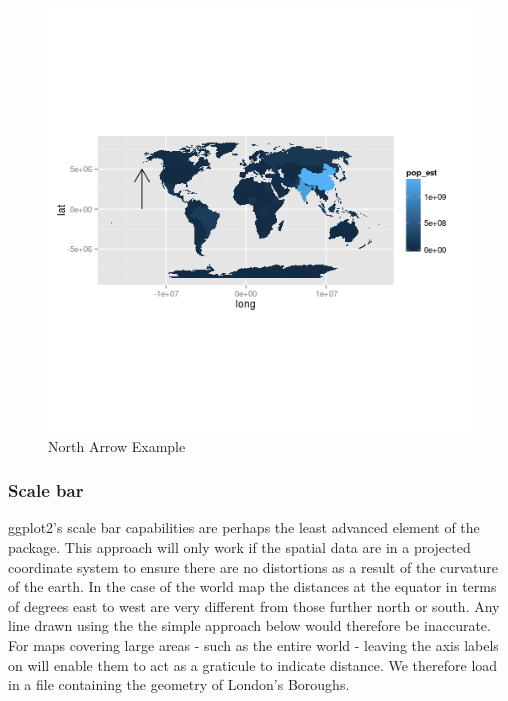 \documentclass[]{article}
\begin{document}
\begin{figure}[htbp]
\centering
\includegraphics{figure/North_Arrow_Example.png}
\caption{North Arrow Example}
\end{figure}

\subsubsection{Scale bar}\label{scale-bar}

ggplot2's scale bar capabilities are perhaps the least advanced element
of the package. This approach will only work if the spatial data are in
a projected coordinate system to ensure there are no distortions as a
result of the curvature of the earth. In the case of the world map the
distances at the equator in terms of degrees east to west are very
different from those further north or south. Any line drawn using the
the simple approach below would therefore be inaccurate. For maps
covering large areas - such as the entire world - leaving the axis
labels on will enable them to act as a graticule to indicate distance.
We therefore load in a file containing the geometry of London's
Boroughs.
\end{document}
